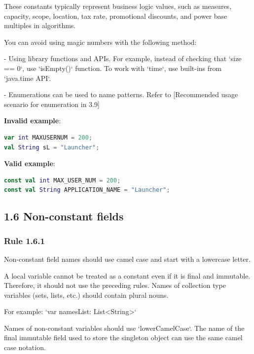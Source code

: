 These constants typically represent business logic values, such as measures, capacity, scope, location, tax rate, promotional discounts, and power base multiples in algorithms.

You can avoid using magic numbers with the following method:

- Using library functions and APIs. For example, instead of checking that `size == 0`, use `isEmpty()` function. To work with `time`, use built-ins from `java.time API`.

- Enumerations can be used to name patterns. Refer to [Recommended usage scenario for enumeration in 3.9]



\textbf{Invalid example}:



\begin{lstlisting}[language=Kotlin]
var int MAXUSERNUM = 200;
val String sL = "Launcher";
\end{lstlisting}


\textbf{Valid example}:



\begin{lstlisting}[language=Kotlin]
const val int MAX_USER_NUM = 200;
const val String APPLICATION_NAME = "Launcher";
\end{lstlisting}


\subsection*{\textbf{1.6 Non-constant fields}}

\subsubsection*{\textbf{Rule 1.6.1}}
\leavevmode\newline

Non-constant field names should use camel case and start with a lowercase letter.

A local variable cannot be treated as a constant even if it is final and immutable. Therefore, it should not use the preceding rules. Names of collection type variables (sets, lists, etc.) should contain plural nouns.

For example: `var namesList: List<String>`



Names of non-constant variables should use `lowerCamelCase`. The name of the final immutable field used to store the singleton object can use the same camel case notation.




